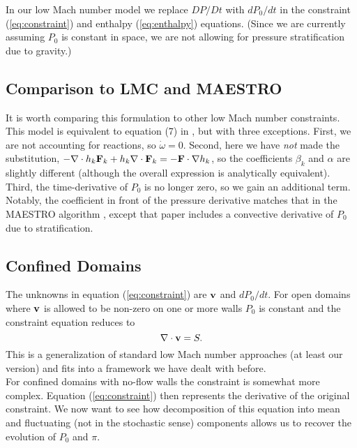 \documentclass[final]{siamltex}
\def\Fb {{\bf F}}
\def\vb {{\bf v}}
\begin{document}
In our low Mach number model we replace $DP/Dt$ with $dP_0/ dt$ in the 
constraint (\ref{eq:constraint}) and enthalpy (\ref{eq:enthalpy}) equations.
(Since we are currently assuming $P_0$ is constant in space,
we are not allowing for pressure stratification due to gravity.)

\subsection{Comparison to LMC and MAESTRO}
It is worth comparing this formulation to other low Mach number constraints.
This model is equivalent to equation (7) in \cite{DayBell:2000},
but with three exceptions.  First,
we are not accounting for reactions, so $\dot\omega=0$.  Second, here we have 
{\it not} made the substitution, 
$-\nabla\cdot h_k\Fb_k + h_k\nabla\cdot\Fb_k = -\Fb\cdot\nabla h_k$, so the coefficients
$\beta_k$ and $\alpha$ are slightly different (although the overall expression is
analytically equivalent).  Third, the time-derivative of $P_0$ is no longer zero,
so we gain an additional term.  Notably, the coefficient in front of the pressure 
derivative matches that in the MAESTRO algorithm \cite{MAESTROIII},
except that paper includes a convective derivative of $P_0$ due to stratification.

\subsection{Confined Domains}
The unknowns in equation (\ref{eq:constraint}) are $\vb$ and $dP_0/d t$.
For open domains where $\vb$ is allowed to be non-zero on one or more walls $P_0$
is constant and the constraint equation reduces to
\begin{equation}
\nabla\cdot\vb = S.
\end{equation}
This is a generalization of standard low Mach number approaches (at least our version) 
and fits into
a framework we have dealt with before.\\

For confined domains with no-flow walls the constraint is somewhat more complex.
Equation (\ref{eq:constraint}) then represents the derivative of the original
constraint.  We now want to see how
decomposition of this equation into mean and fluctuating (not in the stochastic sense)
components allows us to recover the evolution of $P_0$ and $\pi$.\\
\end{document}
